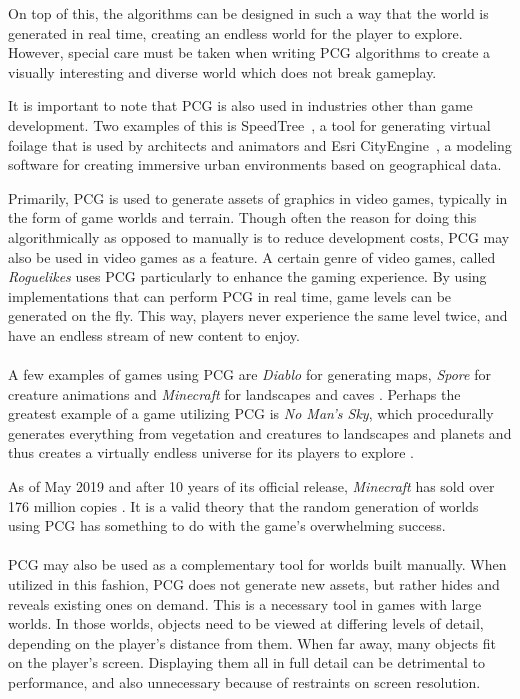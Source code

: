 On top of this, the algorithms can be designed in such a way that the world is generated in real time, creating an endless world for the player to explore. However, special care must be taken when writing PCG algorithms to create a visually interesting and diverse world which does not break gameplay.

It is important to note that PCG is also used in industries other than game development. Two examples of this is SpeedTree~\cite{SpeedTree}, a tool for generating virtual foilage that is used by architects and animators and Esri CityEngine~\cite{CityEngine}, a modeling software for creating immersive urban environments based on geographical data.


Primarily, PCG is used to generate assets of graphics in video games, typically in the form of game worlds and terrain. Though often the reason for doing this algorithmically as opposed to manually is to reduce development costs, PCG may also be used in video games as a feature. A certain genre of video games, called \textit{Roguelikes} uses PCG particularly to enhance the gaming experience. By using implementations that can perform PCG in real time, game levels can be generated on the fly. This way, players never experience the same level twice, and have an endless stream of new content to enjoy.
\\\\
A few examples of games using PCG are \textit{Diablo} for generating maps, \textit{Spore} for creature animations and \textit{Minecraft} for landscapes and caves \cite[p. 4]{shaker2016procedural}. Perhaps the greatest example of a game utilizing PCG is \textit{No Man's Sky}, which procedurally generates everything from vegetation and creatures to landscapes and planets and thus creates a virtually endless universe for its players to explore \cite{MIT_No_Mans_Sky}.

As of May 2019 and after 10 years of its official release, \textit{Minecraft} has sold over 176 million copies \cite{Minecraft_10ys}. It is a valid theory that the random generation of worlds using PCG has something to do with the game's overwhelming success.
\\\\
PCG may also be used as a complementary tool for worlds built manually. When utilized in this fashion, PCG does not generate new assets, but rather hides and reveals existing ones on demand. This is a necessary tool in games with large worlds. In those worlds, objects need to be viewed at differing levels of detail, depending on the player's distance from them. When far away, many objects fit on the player's screen. Displaying them all in full detail can be detrimental to performance, and also unnecessary because of restraints on screen resolution. 

